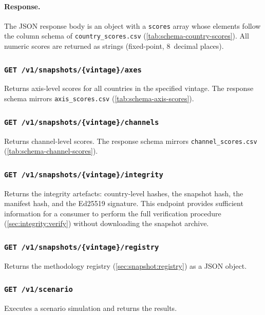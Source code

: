 \paragraph{Response.}
The JSON response body is an object with a \texttt{scores} array whose
elements follow the column schema of \texttt{country\_scores.csv}
(\cref{tab:schema-country-scores}).  All numeric scores are returned as
strings (fixed-point, 8~decimal places).

\subsubsection{\texttt{GET /v1/snapshots/\{vintage\}/axes}}

Returns axis-level scores for all countries in the specified vintage.
The response schema mirrors \texttt{axis\_scores.csv}
(\cref{tab:schema-axis-scores}).

\subsubsection{\texttt{GET /v1/snapshots/\{vintage\}/channels}}

Returns channel-level scores.  The response schema mirrors
\texttt{channel\_scores.csv} (\cref{tab:schema-channel-scores}).

\subsubsection{\texttt{GET /v1/snapshots/\{vintage\}/integrity}}

Returns the integrity artefacts: country-level hashes, the snapshot hash,
the manifest hash, and the Ed25519 signature.  This endpoint provides
sufficient information for a consumer to perform the full verification
procedure (\cref{sec:integrity:verify}) without downloading the snapshot
archive.

\subsubsection{\texttt{GET /v1/snapshots/\{vintage\}/registry}}

Returns the methodology registry (\cref{sec:snapshot:registry}) as a
JSON object.

\subsubsection{\texttt{GET /v1/scenario}}

Executes a scenario simulation and returns the results.

